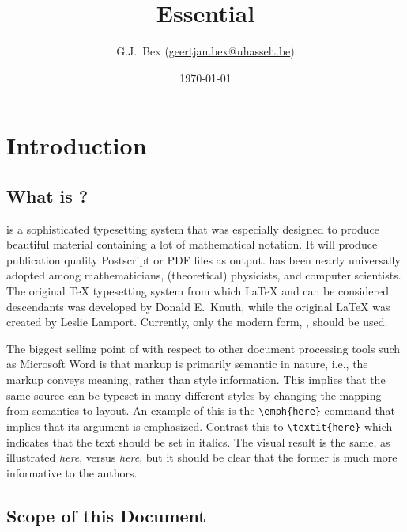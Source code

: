 \documentclass[11pt,a4paper,oneside]{book}
\begin{document}
\newcommand{\tableheader}[1]{\textbf{#1}}
\newcommand{\ientry}[1]{#1\index{#1}}
\newcommand{\imentry}[1]{#1\index{#1|\textbf}}

\frontmatter
\title{Essential \LaTeXe{}}
\author{G.J.\ Bex (\url{geertjan.bex@uhasselt.be})}
\date{\today}

\maketitle
\tableofcontents

\mainmatter

\chapter{Introduction}
\label{ch:intro}

\section{What is \LaTeXe{}?}
\label{sec:what-is-latex}

\LaTeXe{} is a sophisticated typesetting system that was especially designed to produce beautiful material containing a lot of mathematical notation.  It will produce publication quality Postscript or PDF files as output.
\LaTeXe{} has been nearly universally  adopted among mathematicians, (theoretical) physicists, and computer scientists.  The original \TeX{} typesetting system from which \LaTeX{} and \LaTeXe{} can be considered descendants was developed by Donald E.\ Knuth, while the  original \LaTeX{} was created by Leslie Lamport.  Currently, only the modern form, \LaTeXe{}, should be used.

The biggest selling point of \LaTeXe{} with respect to other document processing tools such as Microsoft Word is that markup is primarily semantic in nature, i.e., the markup conveys meaning, rather than style information.  This implies that the same \LaTeXe{} source can be typeset in many different styles by changing the mapping from semantics to layout.
An example of this is the \verb|\emph{here}| command that implies that its argument is emphasized.  Contrast this to \verb|\textit{here}| which indicates that the text should be set in italics.  The visual result is the same, as illustrated \emph{here}, versus \textit{here}, but it should be clear that the former is much more informative to the authors.


\section{Scope of this Document}
\label{sec:scope}
\end{document}
